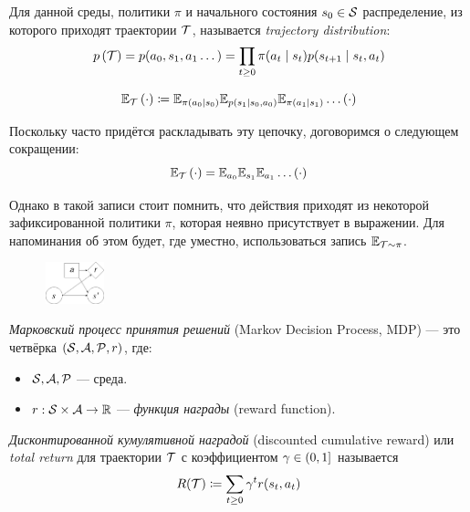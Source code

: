 \documentclass[../main.tex]{subfiles}
\begin{document}
Для данной среды, политики $\pi$ и начального состояния $s_0 \HM\in \St$ распределение, из которого приходят траектории $\mathcal{T}$, называется \emph{trajectory distribution}:
$$p\left(\mathcal{T} \right) = p(a_0, s_1, a_1 \dots) = \prod_{t \ge 0} \pi(a_t \mid s_t) p(s_{t+1} \mid s_t, a_t)$$



\begin{equation}\label{traj_expectation}
\mathbb{E}_{\mathcal{T}} \left( \cdot \right) \coloneqq \mathbb{E}_{\pi(a_0 \mid s_0)}\mathbb{E}_{p(s_1 \mid s_0, a_0)}\mathbb{E}_{\pi(a_1 \mid s_1)} \dots \left( \cdot \right)
\end{equation}

Поскольку часто придётся раскладывать эту цепочку, договоримся о следующем сокращении:
$$\mathbb{E}_{\mathcal{T}} \left( \cdot \right) = \mathbb{E}_{a_0}\mathbb{E}_{s_1}\mathbb{E}_{a_1} \dots \left( \cdot \right)$$

Однако в такой записи стоит помнить, что действия приходят из некоторой зафиксированной политики $\pi$, которая неявно присутствует в выражении. Для напоминания об этом будет, где уместно, использоваться запись $\mathbb{E}_{\mathcal{T} \sim \pi}$.



\begin{figure}
	\vspace{-0.4cm}
	\centering
	\includegraphics[width=0.15\textwidth]{Images/MDP.drawio.png}
	
	\vspace{-0.8cm}
\end{figure}


	\emph{Марковский процесс принятия решений} (Markov Decision Process, MDP) --- это четвёрка $(\mathcal{S}, \mathcal{A}, \mathcal{P}, r)$, где: 
	
	
	
	\begin{itemize}
		\item $\mathcal{S}, \mathcal{A}, \mathcal{P}$ --- среда.
		\item $r: \mathcal{S} \times \mathcal{A} \to \mathbb{R}$ --- \emph{функция награды} (reward function).
	\end{itemize}





	\emph{Дисконтированной кумулятивной наградой} (discounted cumulative reward) или \emph{total return} для траектории $\mathcal{T}$ с коэффициентом $\gamma \HM\in (0, 1]$ называется
	\begin{equation}\label{return}
	R(\mathcal{T}) \coloneqq \sum_{t \ge 0} \gamma^t r(s_t, a_t)
	\end{equation}
\end{document}
